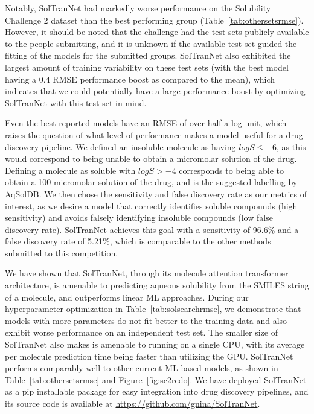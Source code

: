 \documentclass[journal=jmcmar,manuscript=article]{achemso}
\begin{document}
Notably, SolTranNet had markedly worse performance on the Solubility Challenge 2 dataset than the best performing group (Table~\ref{tab:othersetsrmse}).
However, it should be noted that the challenge had the test sets publicly available to the people submitting, and it is unknown if the available test set guided the fitting of the models for the submitted groups.
SolTranNet also exhibited the largest amount of training variability on these test sets (with the best model having a 0.4 RMSE performance boost as compared to the mean), which indicates that we could potentially have a large performance boost by optimizing SolTranNet with this test set in mind.

Even the best reported models have an RMSE of over half a log unit, which raises the question of what level of performance makes a model useful for a drug discovery pipeline.
We defined an insoluble molecule as having $logS \leq -6$, as this would correspond to being unable to obtain a micromolar solution of the drug.
Defining a molecule as soluble with $logS > -4$ corresponds to being able to obtain a 100 micromolar solution of the drug, and is the suggested labelling by AqSolDB\cite{AqSol}.
We then chose the sensitivity and false discovery rate as our metrics of interest, as we desire a model that correctly identifies soluble compounds (high sensitivity) and avoids falsely identifying insoluble compounds (low false discovery rate).
SolTranNet achieves this goal with a sensitivity of 96.6\% and a false discovery rate of 5.21\%, which is comparable to the other methods submitted to this competition.

We have shown that SolTranNet, through its molecule attention transformer architecture, is amenable to predicting aqueous solubility from the SMILES string of a molecule, and outperforms linear ML approaches.
During our hyperparameter optimization in Table~\ref{tab:solsearchrmse}, we demonstrate that models with more parameters do not fit better to the training data and also exhibit worse performance on an independent test set.
The smaller size of SolTranNet also makes is amenable to running on a single CPU, with its average per molecule prediction time being faster than utilizing the GPU.
SolTranNet performs comparably well to other current ML based models, as shown in Table~\ref{tab:othersetsrmse} and Figure~\ref{fig:sc2redo}.
We have deployed SolTranNet as a pip installable package for easy integration into drug discovery pipelines, and its source code is available at \url{https://github.com/gnina/SolTranNet}.
\end{document}
